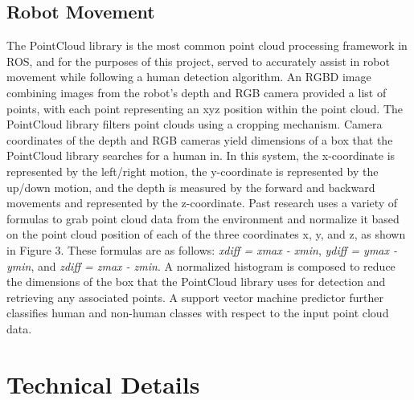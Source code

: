 \documentclass{ndjflart}
\theoremstyle{definition}
\theoremstyle{remark}
\begin{document}
\subsection{Robot Movement}\label{macros} 
The PointCloud library is the most common point cloud processing framework in ROS, and for the purposes of this project, served to accurately assist in robot movement while following a human detection algorithm. An RGBD image combining images from the robot's depth and RGB camera provided a list of points, with each point representing an xyz position within the point cloud. The PointCloud library filters point clouds using a cropping mechanism. Camera coordinates of the depth and RGB cameras yield dimensions of a box that the PointCloud library searches for a human in. In this system, the x-coordinate is represented by the left/right motion, the y-coordinate is represented by the up/down motion, and the depth is measured by the forward and backward movements and represented by the z-coordinate. Past research uses a variety of formulas to grab point cloud data from the environment and normalize it based on the point cloud position of each of the three coordinates x, y, and z, as shown in Figure 3. These formulas are as follows: \textit{xdiff = xmax - xmin}, \textit{ydiff = ymax - ymin}, and \textit{zdiff = zmax - zmin}. A normalized histogram is composed to reduce the dimensions of the box that the PointCloud library uses for detection and retrieving any associated points. A support vector machine predictor further classifies human and non-human classes with respect to the input point cloud data.

\section{Technical Details}\label{secs} 
\end{document}
